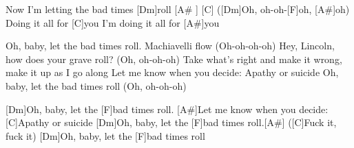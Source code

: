\begin{guitar}
	Now I'm letting the bad times [Dm]roll [A# ] [C]{}
	([Dm]Oh, oh-oh-[F]oh, [A#]oh)
	Doing it all for [C]you
	I'm doing it all for [A#]you
	
	\begin{highlightbar}
		Oh, baby, let the bad times roll. Machiavelli flow (Oh-oh-oh-oh)
		Hey, Lincoln, how does your grave roll? (Oh, oh-oh-oh)
		Take what’s right and make it wrong, make it up as I go along
		Let me know when you decide: Apathy or suicide
		Oh, baby, let the bad times roll (Oh, oh-oh-oh)
	\end{highlightbar}
	
	[Dm]Oh, baby, let the [F]bad times roll.
	[A#]Let me know when you decide: [C]Apathy or suicide
	[Dm]Oh, baby, let the [F]bad times roll.[A#] ([C]Fuck it, fuck it)
	[Dm]Oh, baby, let the [F]bad times roll
\end{guitar}
